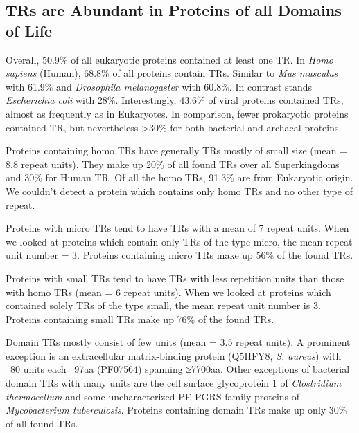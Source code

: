 \documentclass[a4,center,fleqn]{NAR}
\begin{document}
\subsection{TRs are Abundant in Proteins of all Domains of Life}
Overall, 50.9\% of all eukaryotic proteins contained at least one TR. In \textit{Homo sapiens} (Human), 68.8\% of all proteins contain TRs. Similar to \textit{Mus musculus} with 61.9\% and \textit{Drosophila melanogaster} with 60.8\%. In contrast stands \textit{Escherichia coli} with 28\%. 
Interestingly, 43.6\% of viral proteins contained TRs, almost as frequently as in Eukaryotes. In comparison, fewer prokaryotic proteins contained TR, but nevertheless >30\% for both bacterial and archaeal proteins. 

Proteins containing homo TRs have generally TRs mostly of small size (mean = 8.8 repeat units). They make up 20\% of all found TRs over all Superkingdoms and 30\% for Human TR. Of all the homo TRs, 91.3\% are from Eukaryotic origin. We couldn't detect a protein which contains only homo TRs and no other type of repeat.

Proteins with micro TRs tend to have TRs with a mean of 7 repeat units. When we looked at proteins which contain only TRs of the type micro, the mean repeat unit number = 3. 
Proteins containing micro TRs make up 56\% of the found TRs.

Proteins with small TRs tend to have TRs with less repetition units than those with homo TRs (mean = 6 repeat units). When we looked at proteins which contained solely TRs of the type small, the mean repeat unit number is 3. 
Proteins containing small TRs make up 76\% of the found TRs.

Domain TRs mostly consist of few units (mean = 3.5 repeat units). A prominent exception is an extracellular matrix-binding protein (Q5HFY8, \textit{S. aureus}) with ~80 units each ~97aa (PF07564) spanning ≥7700aa. Other exceptions of bacterial domain TRs with many units are the cell surface glycoprotein 1 of \textit{Clostridium thermocellum} and some uncharacterized PE-PGRS family proteins of \textit{Mycobacterium tuberculosis}. Proteins containing domain TRs make up only 30\% of all found TRs.
\end{document}
